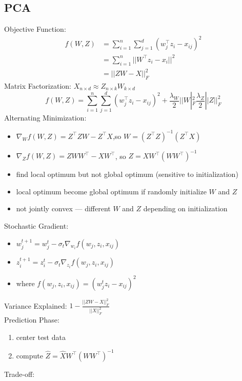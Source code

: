 \documentclass[10pt,landscape,a4paper]{article}
\begin{document}
\begin{multicols*}{5}
\section{PCA}
Objective Function:
\begin{align*}
    f(W,Z) &= \sum_{i=1}^{n} \sum_{j=1}^{d} (w_j^\intercal z_i - x_{ij})^2 \\
    &= \sum_{i=1}^{n} ||W^\intercal z_i - x_i||^2 \\
    &= ||ZW-X||_F^2
\end{align*}
Matrix Factorization: \(X_{n \times d} \approx Z_{n \times k} W_{k \times d}\) \\
\begin{dmath*}
    f(W,Z) = \sum_{i=1}^{n} \sum_{j=1}^{d} (w_j^\intercal z_i - x_{ij})^2 + \frac{\lambda_W}{2} ||W|_F^2 \frac{\lambda_Z}{2} ||Z||_F^2
\end{dmath*}
Alternating Minimization:
\begin{itemize}
    \item \(\nabla_W f(W,Z) = Z^\intercal Z W - Z^\intercal X\),so \(W = (Z^\intercal Z)^{-1} (Z^\intercal X)\)
    \item \(\nabla_Z f(W,Z) = Z W W^\intercal - X W^\intercal \), so \(Z = X W^\intercal (W W^\intercal)^{-1}\)
    \item find local optimum but not global optimum (sensitive to initialization)
    \item local optimum become global optimum if randomly initialize \(W\) and \(Z\)
    \item not jointly convex --- different \(W\) and \(Z\) depending on initialization
\end{itemize}
Stochastic Gradient:
\begin{itemize}
    \item \(w_j^{t+1} = w_j^t - \sigma_t \nabla_{w_i} f(w_j,z_i,x_{ij})\)
    \item \(z_i^{t+1} = z_i^t - \sigma_t \nabla_{z_i} f(w_j,z_i,x_{ij})\)
    \item where \(f(w_j,z_i,x_{ij}) = (w_j^t z_i - x_{ij})^2\)
\end{itemize}
Variance Explained: \(1 - \frac{||ZW-X||_F^2}{||X||_F^2}\) \\
Prediction Phase:
\begin{enumerate}
    \item center test data
    \item compute \(\hat{Z} = \hat{X} W^\intercal (W W^\intercal)^{-1}\)
\end{enumerate}
Trade-off:
\begin{itemize}

\end{itemize}
\end{multicols*}
\end{document}
